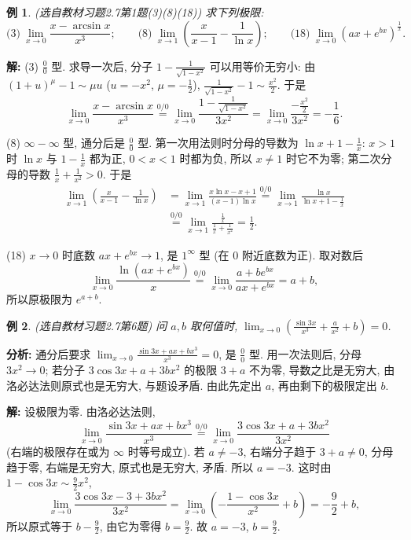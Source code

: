\documentclass[UTF8,openany]{ctexbook}
\theoremstyle{chinesetextbook}
\newtheorem{example}{例}[section]
\newenvironment{cnsolution}{\par\indent\textbf{解:} \ignorespaces}{\par}
\begin{document}
\begin{example}\label{ex:c2-h7-1}
\textnormal{(选自教材习题2.7第1题(3)(8)(18))} 求下列极限:
\[
\text{(3)}\ \lim_{x\to0}\frac{x-\arcsin x}{x^3};\qquad\text{(8)}\ \lim_{x\to1}\left(\frac x{x-1}-\frac1{\ln x}\right);\qquad\text{(18)}\ \lim_{x\to0}\left(ax+e^{bx}\right)^{\frac1x}.
\]
\end{example}
\begin{cnsolution}
(3) $\displaystyle\frac00$ 型. 求导一次后, 分子 $\displaystyle1-\frac1{\sqrt{1-x^2}}$ 可以用等价无穷小: 由 $(1+u)^\mu-1\sim\mu u$ ($u=-x^2$, $\displaystyle\mu=-\frac12$), $\displaystyle\frac1{\sqrt{1-x^2}}-1\sim\frac{x^2}2$. 于是
\[
\lim_{x\to0}\frac{x-\arcsin x}{x^3}\overset{0/0}{=}\lim_{x\to0}\frac{1-\frac1{\sqrt{1-x^2}}}{3x^2}=\lim_{x\to0}\frac{-\frac{x^2}2}{3x^2}=-\frac16.
\]

(8) $\infty-\infty$ 型, 通分后是 $\displaystyle\frac00$ 型. 第一次用法则时分母的导数为 $\displaystyle\ln x+1-\frac1x$: $x>1$ 时 $\ln x$ 与 $\displaystyle1-\frac1x$ 都为正, $0<x<1$ 时都为负, 所以 $x\ne1$ 时它不为零; 第二次分母的导数 $\displaystyle\frac1x+\frac1{x^2}>0$. 于是
\[
\begin{aligned}
\lim_{x\to1}\left(\frac x{x-1}-\frac1{\ln x}\right)&=\lim_{x\to1}\frac{x\ln x-x+1}{(x-1)\ln x}\overset{0/0}{=}\lim_{x\to1}\frac{\ln x}{\ln x+1-\frac1x}\\
&\overset{0/0}{=}\lim_{x\to1}\frac{\frac1x}{\frac1x+\frac1{x^2}}=\frac12.
\end{aligned}
\]

(18) $x\to0$ 时底数 $ax+e^{bx}\to1$, 是 $1^\infty$ 型 (在 $0$ 附近底数为正). 取对数后
\[
\lim_{x\to0}\frac{\ln\left(ax+e^{bx}\right)}x\overset{0/0}{=}\lim_{x\to0}\frac{a+be^{bx}}{ax+e^{bx}}=a+b,
\]
所以原极限为 $e^{a+b}$.
\end{cnsolution}
\begin{example}\label{ex:c2-h7-6}
\textnormal{(选自教材习题2.7第6题)} 问 $a,b$ 取何值时, $\displaystyle\lim_{x\to0}\left(\frac{\sin3x}{x^3}+\frac a{x^2}+b\right)=0$.
\end{example}
\par\indent\textbf{分析:} 通分后要求 $\displaystyle\lim_{x\to0}\frac{\sin3x+ax+bx^3}{x^3}=0$, 是 $\displaystyle\frac00$ 型. 用一次法则后, 分母 $3x^2\to0$; 若分子 $3\cos3x+a+3bx^2$ 的极限 $3+a$ 不为零, 导数之比是无穷大, 由洛必达法则原式也是无穷大, 与题设矛盾. 由此先定出 $a$, 再由剩下的极限定出 $b$.
\begin{cnsolution}
设极限为零. 由洛必达法则,
\[
\lim_{x\to0}\frac{\sin3x+ax+bx^3}{x^3}\overset{0/0}{=}\lim_{x\to0}\frac{3\cos3x+a+3bx^2}{3x^2}
\]
(右端的极限存在或为 $\infty$ 时等号成立). 若 $a\ne-3$, 右端分子趋于 $3+a\ne0$, 分母趋于零, 右端是无穷大, 原式也是无穷大, 矛盾. 所以 $a=-3$. 这时由 $\displaystyle1-\cos3x\sim\frac92x^2$,
\[
\lim_{x\to0}\frac{3\cos3x-3+3bx^2}{3x^2}=\lim_{x\to0}\left(-\frac{1-\cos3x}{x^2}+b\right)=-\frac92+b,
\]
所以原式等于 $\displaystyle b-\frac92$, 由它为零得 $\displaystyle b=\frac92$. 故 $a=-3$, $\displaystyle b=\frac92$.
\end{cnsolution}
\end{document}
